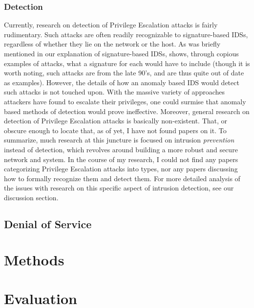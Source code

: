 \documentclass{acm_proc_article-sp}
\begin{document}
     \subsubsection{Detection}
     	Currently, research on detection of Privilege Escalation attacks is fairly rudimentary. Such attacks are often readily recognizable to signature-based IDSs, regardless of whether they lie on the network or the host. As was briefly mentioned in our explanation of signature-based IDSs, \cite{Labs1999} shows, through copious examples of attacks, what a signature for each would have to include (though it is worth noting, such attacks are from the late 90's, and are thus quite out of date as examples). However, the details of how an anomaly based IDS would detect such attacks is not touched upon. With the massive variety of approaches attackers have found to escalate their privileges, one could surmise that anomaly based methods of detection would prove ineffective. Moreover, general research on detection of Privilege Escalation attacks is basically non-existent. That, or obscure enough to locate that, as of yet, I have not found papers on it. To summarize, much research at this juncture is focused on intrusion \emph{prevention} instead of detection, which revolves around building a more robust and secure network and system. In the course of my research, I could not find any papers categorizing Privilege Escalation attacks into types, nor any papers discussing how to formally recognize them and detect them. For more detailed analysis of the issues with research on this specific aspect of intrusion detection, see our discussion section.
     
     
    \subsection{Denial of Service}

\section{Methods}

\section{Evaluation}
\end{document}
